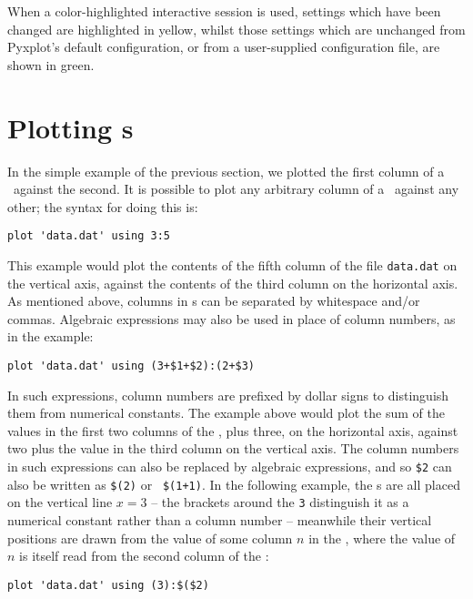 When a color-highlighted interactive session is used, settings which have been
changed are highlighted in yellow, whilst those settings which are unchanged
from Pyxplot's default configuration, or from a user-supplied configuration
file, are shown in green.

\section{Plotting \datafile s}
\label{sec:plot_datafiles}

In the simple example of the previous section, we plotted the first column of a
\datafile\ against the second. It is possible to plot any arbitrary column of a
\datafile\ against any other; the syntax for doing this is:

\begin{verbatim}
plot 'data.dat' using 3:5
\end{verbatim}

\noindent This example would plot the contents of the fifth column of the file
{\tt data.dat} on the vertical axis, against the contents of the third column
on the horizontal axis. As mentioned above, columns in \datafile s can be
separated by whitespace and/or commas.  Algebraic expressions may also be used
in place of column numbers, as in the example:

\begin{verbatim}
plot 'data.dat' using (3+$1+$2):(2+$3)
\end{verbatim}

\noindent In such expressions, column numbers are prefixed by dollar signs to
distinguish them from numerical constants. The example above would plot the sum
of the values in the first two columns of the \datafile, plus three, on the
horizontal axis, against two plus the value in the third column on the vertical
axis. The column numbers in such expressions can also be replaced by algebraic
expressions, and so {\tt \$2} can also be written as {\tt \$(2)} or {\tt
\$(1+1)}. In the following example, the \datapoint s are all placed on the
vertical line $x=3$ -- the brackets around the {\tt 3} distinguish it as a
numerical constant rather than a column number -- meanwhile their vertical
positions are drawn from the value of some column $n$ in the \datafile, where
the value of $n$ is itself read from the second column of the \datafile:

\begin{verbatim}
plot 'data.dat' using (3):$($2)
\end{verbatim}


